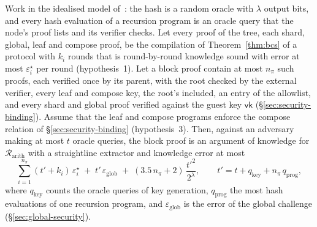 \begin{theorem}
\label{thm:composition}
Work in the idealised model of~\citep[\S2.3]{cgsy24}: the hash is a random oracle with $\lambda$ output bits, and every hash evaluation of a recursion program is an oracle query that the node's proof lists and its verifier checks. Let every proof of the tree, each shard, global, leaf and compose proof, be the compilation of Theorem~\ref{thm:bcs} of a protocol with $k_i$ rounds that is round-by-round knowledge sound with error at most $\varepsilon^\star_i$ per round (hypothesis~1). Let a block proof contain at most $n_\pi$ such proofs, each verified once by its parent, with the root checked by the external verifier, every leaf and compose key, the root's included, an entry of the allowlist, and every shard and global proof verified against the guest key $\mathsf{vk}$ (\S\ref{sec:security-binding}). Assume that the leaf and compose programs enforce the compose relation of \S\ref{sec:security-binding} (hypothesis~3). Then, against an adversary making at most $t$ oracle queries, the block proof is an argument of knowledge for $\mathcal R_{\mathrm{arith}}$ with a straightline extractor and knowledge error at most
\[
  \sum_{i=1}^{n_\pi} (t' + k_i)\,\varepsilon^\star_i \;+\; t'\,\varepsilon_{\mathrm{glob}} \;+\; (3.5\, n_\pi + 2)\, \frac{t'^2}{2^{\lambda}},
  \qquad t' = t + q_{\mathrm{key}} + n_\pi\, q_{\mathrm{prog}},
\]
where $q_{\mathrm{key}}$ counts the oracle queries of key generation, $q_{\mathrm{prog}}$ the most hash evaluations of one recursion program, and $\varepsilon_{\mathrm{glob}}$ is the error of the global challenge (\S\ref{sec:global-security}).
\end{theorem}

